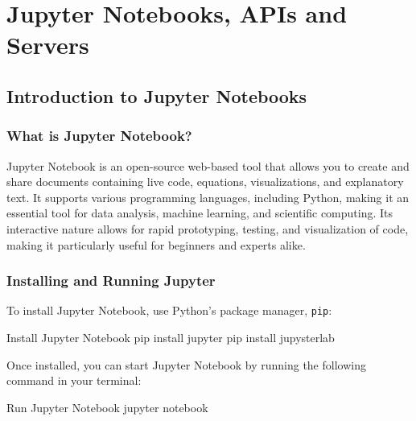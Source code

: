 \chapter{Jupyter Notebooks, APIs and Servers}

%
\section{Introduction to Jupyter Notebooks}

%
\subsection{What is Jupyter Notebook?}


Jupyter Notebook is an open-source web-based tool that allows you to create and share documents containing live code, equations, visualizations, and explanatory text. It supports various programming languages, including Python, making it an essential tool for data analysis, machine learning, and scientific computing. Its interactive nature allows for rapid prototyping, testing, and visualization of code, making it particularly useful for beginners and experts alike.

%
\subsection{Installing and Running Jupyter}

To install Jupyter Notebook, use Python’s package manager, \texttt{pip}:

\begin{codeonly}{Install Jupyter Notebook}
pip install jupyter
pip install jupysterlab
\end{codeonly}

Once installed, you can start Jupyter Notebook by running the following command in your terminal:

\begin{codeonly}{Run Jupyter Notebook}
jupyter notebook
\end{codeonly}

